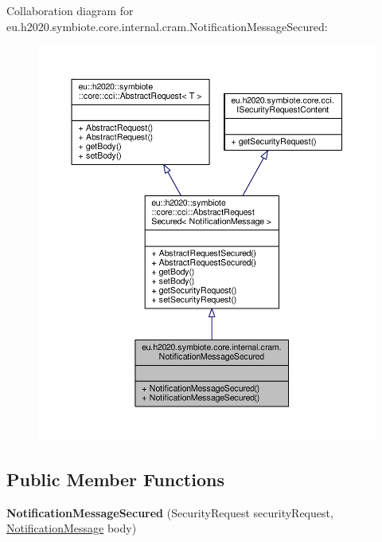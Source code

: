 Collaboration diagram for eu.\+h2020.\+symbiote.\+core.\+internal.\+cram.\+Notification\+Message\+Secured\+:
\nopagebreak
\begin{figure}[H]
\begin{center}
\leavevmode
\includegraphics[width=350pt]{classeu_1_1h2020_1_1symbiote_1_1core_1_1internal_1_1cram_1_1NotificationMessageSecured__coll__graph}
\end{center}
\end{figure}
\subsection*{Public Member Functions}
\begin{DoxyCompactItemize}
\item 
\mbox{\label{classeu_1_1h2020_1_1symbiote_1_1core_1_1internal_1_1cram_1_1NotificationMessageSecured_a04fbd9ee63ec48671437c0d962c7e2ec}} 
{\bfseries Notification\+Message\+Secured} (Security\+Request security\+Request, \hyperlink{classeu_1_1h2020_1_1symbiote_1_1core_1_1cci_1_1accessNotificationMessages_1_1NotificationMessage}{Notification\+Message} body)
\end{DoxyCompactItemize}



